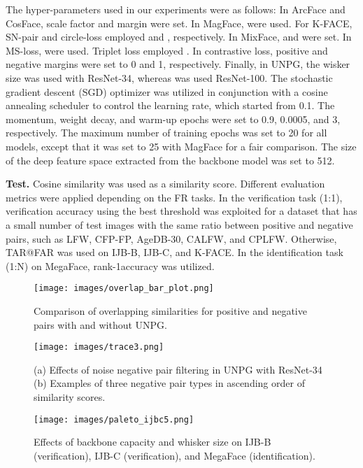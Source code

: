 \documentclass[10pt,twocolumn]{article}
\begin{document}
The hyper-parameters used in our experiments were as follows: In ArcFace and CosFace, scale factor  and margin  were set. In MagFace,  were used. For K-FACE, SN-pair\cite{jung2021mixface} and circle-loss\cite{sun2020circle} employed  and , respectively. In MixFace\cite{jung2021mixface},  and  were set. In MS-loss\cite{wang2019multi},  were used. Triplet loss employed . In contrastive loss, positive and negative margins were set to 0 and 1, respectively. Finally, in UNPG, the wisker size  was used with ResNet-34, whereas  was used ResNet-100. The stochastic gradient descent (SGD) optimizer was utilized in conjunction with a cosine annealing scheduler\cite{loshchilov2016sgdr} to control the learning rate, which started from 0.1. The momentum, weight decay, and warm-up epochs were set to 0.9, 0.0005, and 3, respectively. The maximum number of training epochs was set to 20 for all models, except that it was set to 25 with MagFace for a fair comparison. The size of the deep feature space extracted from the backbone model was set to 512.

\noindent\textbf{Test.} Cosine similarity was used as a similarity score. Different evaluation metrics were applied depending on the FR tasks. In the verification task (1:1), verification accuracy using the best threshold was exploited for a dataset that has a small number of test images with the same ratio between positive and negative pairs, such as LFW, CFP-FP, AgeDB-30, CALFW, and CPLFW. Otherwise, TAR@FAR was used on IJB-B, IJB-C, and K-FACE. In the identification task (1:N) on MegaFace, rank-1accuracy was utilized.

\begin{figure}[t]
    \centering
    \texttt{[image: images/overlap\_bar\_plot.png]}
\caption{Comparison of overlapping similarities for positive and negative pairs with and without UNPG.}
\label{fig:overlap_bar_plot}
\end{figure}

\begin{figure}[t]
    \centering
    \texttt{[image: images/trace3.png]}
\caption{(a) Effects of noise negative pair filtering in UNPG with ResNet-34 (b) Examples of three negative pair types in ascending order of similarity scores.}
\label{fig:gap_between_interpretation_and_reality}
\end{figure}

\begin{figure*}[t]
    \centering
    \texttt{[image: images/paleto\_ijbc5.png]}
\caption{Effects of backbone capacity and whisker size on IJB-B (verification), IJB-C (verification), and MegaFace (identification).}
\label{fig:paleto_ijbc_mega}
\end{figure*}
\end{document}
